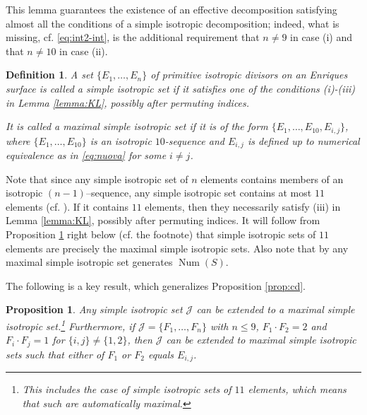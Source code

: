 \documentclass[11pt]{amsart}
\newtheorem{proposition}[thm]{Proposition}
\newtheorem{definition}[thm]{Definition}
\theoremstyle{definition}
\def\I{{\mathcal J}}
\def\Num{\operatorname{Num}}
\renewcommand{\leq}{\leqslant}
\begin{document}
This lemma guarantees the existence of an effective decomposition satisfying almost all the conditions of a simple isotropic decomposition; indeed, what is missing, cf. \eqref{eq:int2-int},  is the additional requirement that $n \neq 9$ in case (i) and that
$n \neq 10$ in case (ii). 








\begin{definition} \label{def:simple}
  A set $\{E_1,\ldots,E_n\}$ of primitive isotropic divisors on an Enriques
surface is called a {\em simple isotropic set} if it satisfies
 one of the conditions (i)-(iii) in Lemma \ref{lemma:KL}, possibly after permuting indices.

It is called a {\em  maximal simple isotropic set} if it is of the form 
$\{E_1,\ldots, E_{10}, E_{i,j}\}$, where $\{E_1,\ldots,E_{10}\}$ is an isotropic $10$-sequence and $E_{i,j}$ is defined up to numerical equivalence as in \color{black} \eqref{eq:nuova} \color{black} for some $i \neq j$.
\end{definition}

Note that since any simple isotropic set of $n$ elements contains
members of an isotropic $(n-1)$--sequence, any simple isotropic set
contains at most $11$ elements (cf. \cite[p.~179]{cd}).
\color{black} If it contains $11$ elements, then they necessarily satisfy (iii) in Lemma \ref{lemma:KL}, possibly after permuting indices. It will follow from Proposition \ref{prop:kl+} right below (cf. the footnote) that simple isotropic
sets of $11$ elements are precisely the maximal simple isotropic sets. 
\color{black} 
Also note that by \cite[Rem. p.~584]{cos2} any maximal simple isotropic set  generates  $\Num(S)$. 

 The following is a key  result, which generalizes Proposition \ref{prop:cd}. 

\begin{proposition} \label{prop:kl+}
 Any simple isotropic set  $\I$  can be extended to a maximal  simple isotropic set.\footnote{ This includes the case of simple isotropic sets of $11$ elements, which means that such are automatically maximal.}  Furthermore, if $\I =\{F_1,\ldots,F_n\}$ with $n \leq 9$, $F_1 \cdot F_2=2$ and $F_i \cdot F_j=1$ for $\{i,j\} \neq \{1,2\}$, then $\I$ can be extended to maximal simple isotropic sets such that either of $F_1$ or $F_2$ equals $E_{i,j}$. 
\end{proposition}
\end{document}
